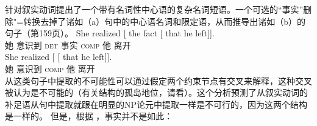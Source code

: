\noindent
 \citet{KK70a}针对叙实动词提出了一个带有名词性中心语的复杂名词短语。一个可选的“事实”删除"=转换去掉了诸如（a）句中的中心语名词和限定语，从而推导出诸如（b）的句子（第159页）。
\eal
\ex 
\gll She realized [ the fact [ that he left]].\\
     她   意识到   {}         \textsc{det} 事实 {} \textsc{comp} 他 离开\\
\ex 
\gll She realized [ [ that he left]].\\
她 意识到 {} {} \textsc{comp} 他 离开\\
\zl
从这类句子中提取的不可能性可以通过假定两个约束节点有交叉来解释，这种交叉被认为是不可能的（有关结构的孤岛地位，请看\citealp[\S~4]{KK70a}）。这个分析预测了从叙实动词的补足语从句中提取就跟在明显的NP论元中提取一样是不可行的，因为这两个结构是一样的。
但是，根据 \citet[]{AG2008a}，事实并不是如此：
\eal
{}
\zl

